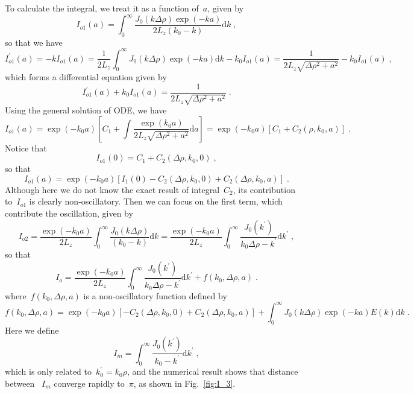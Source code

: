 \documentclass[aps,prl,reprint,showpacs,floatfix,superscriptaddress, onecolumn]{revtex4-2}
\newcommand{\D}[1]{\Delta#1} %
\begin{document}
To calculate the integral, we treat it as a function of~$a$, given by
\begin{equation}
    I_{o1}(a) = \int_0^{\infty} \frac{J_0(k \D \rho) \exp{(-k a)}}{2L_z(k_0 - k)} \text{d}k\;,
\end{equation}
so that we have
\begin{equation}
    I_{o1}^{\prime}(a) = - k I_{o1}(a) = \frac{1}{2L_z} \int_0^{\infty} J_0(k \D \rho) \exp{(-k a)} \text{d}k - k_0 I_{o1}(a) = \frac{1}{2L_z \sqrt{\D \rho^2 + a^2}} - k_0 I_{o1}(a) \;,
\end{equation}
which forms a differential equation given by
\begin{equation}
    I_{o1}^{\prime}(a) + k_0 I_{o1}(a) = \frac{1}{2L_z \sqrt{\D \rho^2 + a^2}}\;.
\end{equation}
Using the general solution of ODE, we have
\begin{equation}
    I_{o1}(a) = \exp{(-k_0 a)} \left[C_1 + \int \frac{\exp{(k_0 a)}}{2L_z \sqrt{\D \rho^2 + a^2}} \text{d}a \right] = \exp{(-k_0 a)} \left[C_1 + C_2(\rho, k_0, a) \right] \;.
\end{equation}
Notice that
\begin{equation}
    I_{o1}(0) = C_1 + C_2(\D \rho, k_0, 0)\;,
\end{equation}
so that
\begin{equation}
    I_{o1}(a) = \exp{(-k_0 a)} \left[ I_1(0) - C_2(\D \rho, k_0, 0) + C_2(\D \rho, k_0, a) \right]\;.
\end{equation}
Although here we do not know the exact result of integral~$C_2$, its contribution to~$I_{o1}$ is clearly non-oscillatory.
Then we can focus on the first term, which contribute the oscillation, given by 
\begin{equation}
    I_{o2} = \frac{\exp{(-k_0 a)}}{2L_z} \int_0^{\infty} \frac{J_0(k \D \rho)}{(k_0 - k)} \text{d}k = \frac{\exp{(-k_0 a)}}{2L_z} \int_0^{\infty} \frac{J_0(k^\prime)}{k_0 \D \rho - k^\prime} \text{d}k^\prime\;,
\end{equation}
so that 
\begin{equation}
    I_o = \frac{\exp{(-k_0 a)}}{2L_z} \int_0^{\infty} \frac{J_0(k^\prime)}{k_0 \D \rho - k^\prime} \text{d}k^\prime + f(k_0, \D \rho, a)\;.
\end{equation}
where~$f(k_0, \D \rho, a)$ is a non-oscillatory function defined by
\begin{equation}
    f(k_0, \D \rho, a) = \exp{(-k_0 a)} \left[ - C_2(\D \rho, k_0, 0) + C_2(\D \rho, k_0, a) \right] + \int_0^{\infty} J_0(k \D \rho) \exp{(-k a)} E(k) \text{d}k\;.
\end{equation}
Here we define
\begin{equation}
    I_{m} = \int_0^{\infty} \frac{J_0(k^\prime)}{k_0 - k^\prime} \text{d}k^\prime\;,
\end{equation}
which is only related to~$k_0^\prime = k_0 \rho$, and the numerical result shows that distance between ~$I_{m}$ converge rapidly to~$\pi$, as shown in Fig.~\ref{fig:I_3}.
\end{document}
